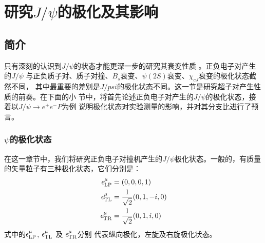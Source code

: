 ﻿\chapter{研究$J/\psi$的极化及其影响}%
\section{简介}
只有深刻的认识到$J/\psi$的状态才能更深一步的研究其衰变性质
。正负电子对产生的$J/\psi$
与正负质子对、质子对撞、$B_{s}$衰变、$\psi(2S)$衰变、$\chi_{cJ}$衰变的极化状态截然不同，
其中最重要的差别是$J/psi$的极化状态不同。这一节是研究超子对产生性质的前奏。在下面的小
节中，将首先论述正负电子对产生的$J/\psi$的极化状态，接着以$J/\psi \to e^{+} e^{-} P$为例
说明极化状态对实验测量的影响，并对其分支比进行了预言。
\subsection{$\psi$的极化状态}
在这一章节中，我们将研究正负电子对撞机产生的$J/\psi$极化状态。一般的，有质量的矢量粒子有三种极化状态，它们分别是：
\begin{equation}
  \begin{split}
    \epsilon^{\mu}_{\rm{LP}} &= (0,0,0,1) \\ 
    \epsilon^{\mu}_{\rm{TL}} &= \frac{1}{\sqrt{2}}(0,1,-i,0) \\ 
    \epsilon^{\mu}_{\rm{TR}} &= \frac{1}{\sqrt{2}}(0,1,i,0)
  \end{split}
\end{equation}
式中的$\epsilon^{\mu}_{\rm{LP}}$,  $\epsilon^{\mu}_{\rm{TL}}$ 及 $\epsilon^{\mu}_{\rm{TR}}$分别
代表纵向极化，左旋及右旋极化状态。


